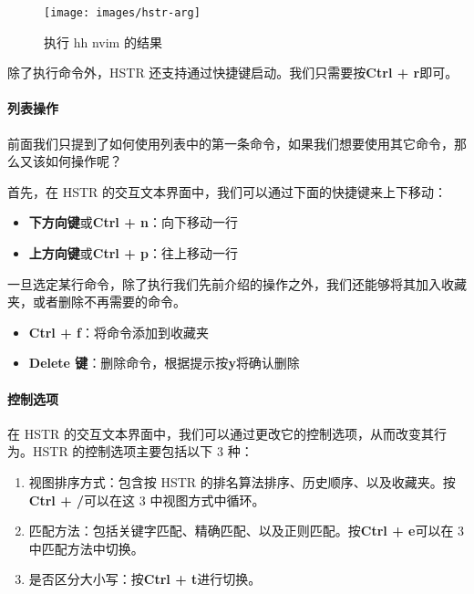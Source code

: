 \documentclass[]{ctexbook}
\providecommand{\tightlist}{%
  \setlength{\itemsep}{0pt}\setlength{\parskip}{0pt}}
\let\oldparagraph\paragraph
\renewcommand{\paragraph}[1]{\oldparagraph{#1}\mbox{}}
\begin{document}
\begin{figure}
\texttt{[image: images/hstr-arg]} \caption{执行 hh nvim 的结果}\label{fig:hstr-arg}
\end{figure}

除了执行命令外，HSTR 还支持通过快捷键启动。我们只需要按\textbf{Ctrl + r}即可。

\hypertarget{ux5217ux8868ux64cdux4f5c}{%
\paragraph{列表操作}\label{ux5217ux8868ux64cdux4f5c}}

前面我们只提到了如何使用列表中的第一条命令，如果我们想要使用其它命令，那么又该如何操作呢？

首先，在 HSTR 的交互文本界面中，我们可以通过下面的快捷键来上下移动：

\begin{itemize}
\tightlist
\item
  \textbf{下方向键}或\textbf{Ctrl + n}：向下移动一行
\item
  \textbf{上方向键}或\textbf{Ctrl + p}：往上移动一行
\end{itemize}

一旦选定某行命令，除了执行我们先前介绍的操作之外，我们还能够将其加入收藏夹，或者删除不再需要的命令。

\begin{itemize}
\tightlist
\item
  \textbf{Ctrl + f}：将命令添加到收藏夹
\item
  \textbf{Delete 键}：删除命令，根据提示按\textbf{y}将确认删除
\end{itemize}

\hypertarget{ux63a7ux5236ux9009ux9879}{%
\paragraph{控制选项}\label{ux63a7ux5236ux9009ux9879}}

在 HSTR 的交互文本界面中，我们可以通过更改它的控制选项，从而改变其行为。HSTR 的控制选项主要包括以下 3 种：

\begin{enumerate}
\def\labelenumi{\arabic{enumi}.}
\tightlist
\item
  视图排序方式：包含按 HSTR 的排名算法排序、历史顺序、以及收藏夹。按\textbf{Ctrl + /}可以在这 3 中视图方式中循环。
\item
  匹配方法：包括关键字匹配、精确匹配、以及正则匹配。按\textbf{Ctrl + e}可以在 3 中匹配方法中切换。
\item
  是否区分大小写：按\textbf{Ctrl + t}进行切换。
\end{enumerate}
\end{document}

